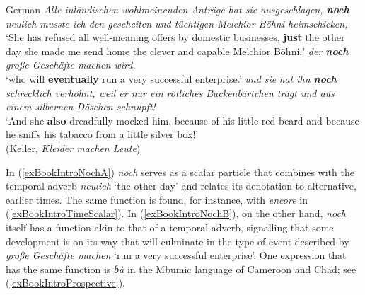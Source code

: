 \begin{exe}
	\ex \label{exBookIntroNoch}
	\begin{xlist}	
	\exi{}German
	\ex \textit{Alle inländischen wohlmeinenden Anträge hat sie ausgeschlagen, \textbf{noch} neulich musste ich den gescheiten und tüchtigen Melchior Böhni heimschicken,}\\
	 \lq She has refused all well-meaning offers by domestic businesses, \textbf{just} the other day she made me send home the clever and capable Melchior Böhni,\rq{}\label{exBookIntroNochA}
 \ex  \textit{der \textbf{noch} große Geschäfte machen wird,}\\
  \lq who will \textbf{eventually} run a very successful enterprise.\rq{}\label{exBookIntroNochB}
  \ex  \textit{und sie hat ihn \textbf{noch} schrecklich verhöhnt, weil er nur ein rötliches Backenbärtchen trägt und aus einem silbernen Döschen schnupft!}\\
	 \lq And she \textbf{also} dreadfully mocked him, because of his little red beard and because he sniffs his tabacco from a little silver box!'
	 \\(Keller, \textit{Kleider machen Leute})\label{exBookIntroNochC}
	\end{xlist}
\end{exe}

In (\ref{exBookIntroNochA}) \textit{noch} serves as a scalar  particle that combines with the temporal adverb \textit{neulich} \lq the other day' and relates its denotation to alternative, earlier times. The same function is found, for instance, with  \textit{encore} in (\ref{exBookIntroTimeScalar}). In (\ref{exBookIntroNochB}), on the other hand, \textit{noch} itself has a function akin to that of a temporal adverb, signalling that some development is on its way that will culminate in the type of event described by \textit{große Geschäfte machen} \lq run a very successful enterprise\rq{}. One expression that has the same function is \textit{ɓà} in the Mbumic language  of Cameroon and Chad; see (\ref{exBookIntroProspective}).

